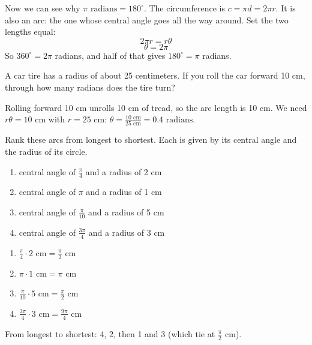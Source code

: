 Now we can see why $\pi \text{ radians} = 180^\circ$. The circumference is
$c = \pi d = 2 \pi r$. It is also an arc: the one whose central angle goes
all the way around. Set the two lengths equal:
$$2 \pi r = r \theta$$
$$\theta = 2\pi$$
So $360^\circ = 2\pi$ radians, and half of that gives $180^\circ = \pi$
radians. 

\begin{Exercise}[title = {Angle of Rotation}, label = radian1]
A car tire has a radius of about 25 centimeters. If you roll the car
forward 10 cm, through how many radians does the tire turn?
\end{Exercise}

\begin{Answer}[ref = radian1]
Rolling forward 10 cm unrolls 10 cm of tread, so the arc length is 10 cm.
We need $r \theta = 10 \text{ cm}$ with $r = 25 \text{ cm}$: $\theta = \frac{10\text{ cm}}{25\text{ cm}} = 0.4\text{ radians}$. 
\end{Answer}

\begin{Exercise}[title = {Arc Length Ranking}, label = radian2]
Rank these arcs from longest to shortest. Each is given by its central
angle and the radius of its circle.
\begin{enumerate}
\item central angle of $\frac{\pi}{4}$ and a radius of 2 cm
\item central angle of $\pi$ and a radius of 1 cm
\item central angle of $\frac{\pi}{10}$ and a radius of 5 cm
\item central angle of $\frac{3\pi}{4}$ and a radius of 3 cm
\end{enumerate}
\end{Exercise}

\begin{Answer}[ref = radian2]
\begin{enumerate}
\item $\frac{\pi}{4} \cdot 2\text{ cm} = \frac{\pi}{2}\text{ cm}$
\item $\pi \cdot 1\text{ cm} = \pi \text{ cm}$
\item $\frac{\pi}{10} \cdot 5\text{ cm} = \frac{\pi}{2}\text{ cm}$
\item $\frac{3\pi}{4} \cdot 3\text{ cm} = \frac{9\pi}{4}\text{ cm}$
\end{enumerate}
From longest to shortest: 4, 2, then 1 and 3 (which tie at $\frac{\pi}{2}$ cm).
\end{Answer}

